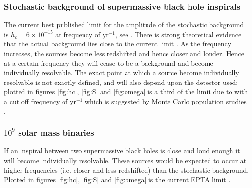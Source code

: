 \subsubsection{Stochastic background of supermassive black hole inspirals}
The current best published limit for the amplitude of the stochastic background is $h_{c}=6\times 10^{-15}$ at frequency of $\textrm{yr}^{-1}$, see \cite{Haasteren}. There is strong theoretical evidence that the actual background lies close to the current limit \citep{imminentdetectionofgravitationalwaves,NONimminentdetectionofgravitationalwaves}. As the frequency increases, the sources become less redshifted and hence closer and louder. Hence at a certain frequency they will cease to be a background and become individually resolvable. The exact point at which a source become individually resolvable is not exactly defined, and will also depend upon the detector used; plotted in figures \ref{fig:hc}, \ref{fig:S} and \ref{fig:omega} is a third of the limit due to \citet{Haasteren} with a cut off frequency of $\textrm{yr}^{-1}$ which is suggested by Monte Carlo population studies \citep{SesanaVecchioColancino}.

\subsubsection{$10^{9}$ solar mass binaries}
If an inspiral between two supermassive black holes is close and loud enough it will become individually resolvable. These sources would be expected to occur at higher frequencies (i.e. closer and less redshifted) than the stochastic background. Plotted in figures \ref{fig:hc}, \ref{fig:S} and \ref{fig:omega} is the current EPTA limit \citep{Haasteren}.



